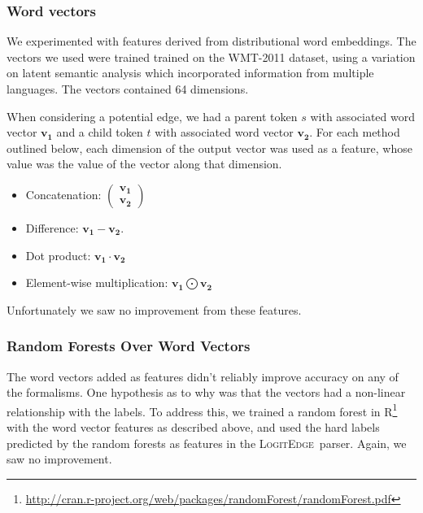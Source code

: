 \documentclass[11pt]{article}
\newcommand{\logitedge}{\textsc{LogitEdge}}
\begin{document}
\subsubsection{Word vectors}

We experimented with features derived from distributional word embeddings.
The vectors we used \cite{wordVectors} were trained trained on the WMT-2011
dataset, using a variation on latent semantic analysis which incorporated
information from multiple languages.
The vectors contained 64 dimensions.

When considering a potential edge, we
had a parent token $s$ with associated word vector $\bm{v_1}$ and a child token
$t$ with associated word vector $\bm{v_2}$.
For each method outlined below, each dimension of the output vector was used as
a feature, whose value was the value of the vector along that dimension.

\begin{itemize}
\item Concatenation:
$ \left( \begin{smallmatrix} \bm{v_1}\\ \bm{v_2}
\end{smallmatrix} \right)$
\item Difference: $\bm{v_1} - \bm{v_2}$.
\item Dot product: $\bm{v_1} \cdot \bm{v_2}$
\item Element-wise multiplication: $\bm{v_1} \bigodot \bm{v_2}$
\end{itemize}
Unfortunately we saw no improvement from these features.

\subsubsection{Random Forests Over Word Vectors}
The word vectors added as features didn't reliably improve accuracy on any of
the formalisms.
One hypothesis as to why was that the vectors had a non-linear relationship
with the labels.
To address this, we trained a random forest in
R\footnote{\url{http://cran.r-project.org/web/packages/randomForest/randomForest.pdf}}
with the word vector features as described above, and used the hard labels
predicted by the random forests as features in the \logitedge\ parser.
Again, we saw no improvement.
\end{document}
